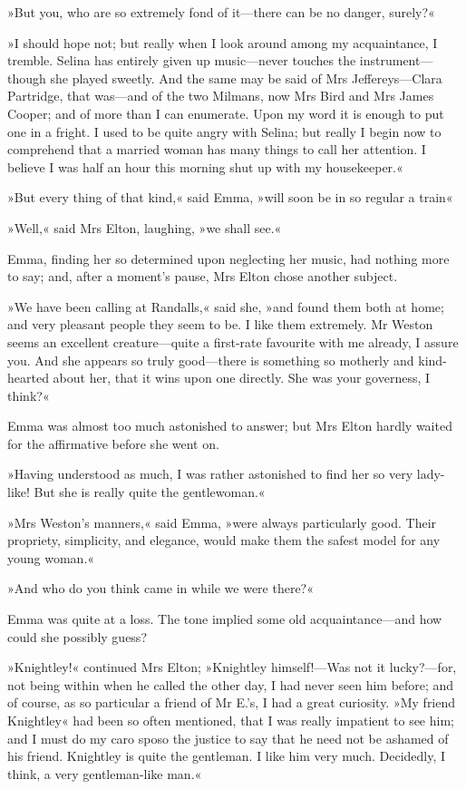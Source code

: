 »But you, who are so extremely fond of it—there can be no danger, surely?«

»I should hope not; but really when I look around among my acquaintance, I tremble. Selina has entirely given up music—never touches the instrument—though she played sweetly. And the same may be said of Mrs Jeffereys—Clara Partridge, that was—and of the two Milmans, now Mrs Bird and Mrs James Cooper; and of more than I can enumerate. Upon my word it is enough to put one in a fright. I used to be quite angry with Selina; but really I begin now to comprehend that a married woman has many things to call her attention. I believe I was half an hour this morning shut up with my housekeeper.«

»But every thing of that kind,« said Emma, »will soon be in so regular a train\longdash«

»Well,« said Mrs Elton, laughing, »we shall see.«

Emma, finding her so determined upon neglecting her music, had nothing more to say; and, after a moment's pause, Mrs Elton chose another subject.

»We have been calling at Randalls,« said she, »and found them both at home; and very pleasant people they seem to be. I like them extremely. Mr Weston seems an excellent creature—quite a first-rate favourite with me already, I assure you. And she appears so truly good—there is something so motherly and kind-hearted about her, that it wins upon one directly. She was your governess, I think?«

Emma was almost too much astonished to answer; but Mrs Elton hardly waited for the affirmative before she went on.

»Having understood as much, I was rather astonished to find her so very lady-like! But she is really quite the gentlewoman.«

»Mrs Weston's manners,« said Emma, »were always particularly good. Their propriety, simplicity, and elegance, would make them the safest model for any young woman.«

»And who do you think came in while we were there?«

Emma was quite at a loss. The tone implied some old acquaintance—and how could she possibly guess?

»Knightley!« continued Mrs Elton; »Knightley himself!—Was not it lucky?—for, not being within when he called the other day, I had never seen him before; and of course, as so particular a friend of Mr E.'s, I had a great curiosity. »My friend Knightley« had been so often mentioned, that I was really impatient to see him; and I must do my caro sposo the justice to say that he need not be ashamed of his friend. Knightley is quite the gentleman. I like him very much. Decidedly, I think, a very gentleman-like man.«


